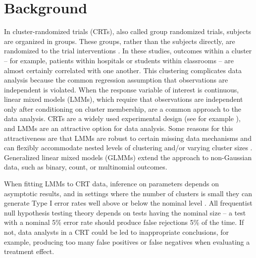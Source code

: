 \documentclass[twocolumn]{bmcart}%
\begin{document}


\section*{Background}


In cluster-randomized trials (CRTs), also called group randomized trials, subjects are organized in groups. These groups, rather than the subjects directly, are randomized to the trial interventions \cite{hayes_cluster_2017}. In these studies, outcomes within a cluster -- for example, patients within hospitals or students within classrooms -- are almost certainly correlated with one another. This clustering complicates data analysis because the common regression assumption that observations are independent is violated. When the response variable of interest is continuous, linear mixed models (LMMs), which require that observations are independent only after conditioning on cluster membership, are a common approach to the data analysis. CRTs are a widely used experimental design (see for example \cite{moon_effect_2017, vinereanu_multifaceted_2017, huang_targeted_2013}), and LMMs are an attractive option for data analysis. Some reasons for this attractiveness are that LMMs are robust to certain missing data mechanisms and can flexibly accommodate nested levels of clustering and/or varying cluster sizes \cite{fitzmaurice_applied_2012}. Generalized linear mixed models (GLMMs) extend the approach to non-Gaussian data, such as binary, count, or multinomial outcomes.

When fitting LMMs to CRT data, inference on parameters depends on asymptotic results, and in settings where the number of clusters is small they can generate Type I error rates well above or below the nominal level \cite{pinheiro_mixed-effects_2009}. All frequentist null hypothesis testing theory depends on tests having the nominal size -- a test with a nominal 5\% error rate should produce false rejections 5\% of the time. If not, data analysts in a CRT could be led to inappropriate conclusions, for example, producing too many false positives or false negatives when evaluating a treatment effect.
\end{document}
